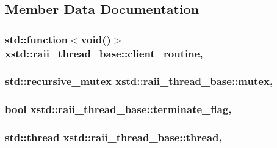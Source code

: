 \subsection{Member Data Documentation}
\hypertarget{classxstd_1_1raii__thread__base_a6b3e160c7eb131008410a16c460b03ff}{
\subsubsection[{client\-\_\-routine}]{\setlength{\rightskip}{0pt plus 5cm}std\-::function$<$void()$>$ xstd\-::raii\-\_\-thread\-\_\-base\-::client\-\_\-routine\hspace{0.3cm}{\ttfamily [protected]}, {\ttfamily [inherited]}}}\label{classxstd_1_1raii__thread__base_a6b3e160c7eb131008410a16c460b03ff}
\hypertarget{classxstd_1_1raii__thread__base_a9d9e01fced1a4f58ea5a9cc165f54fe3}{
\subsubsection[{mutex}]{\setlength{\rightskip}{0pt plus 5cm}std\-::recursive\-\_\-mutex xstd\-::raii\-\_\-thread\-\_\-base\-::mutex\hspace{0.3cm}{\ttfamily [protected]}, {\ttfamily [inherited]}}}\label{classxstd_1_1raii__thread__base_a9d9e01fced1a4f58ea5a9cc165f54fe3}
\hypertarget{classxstd_1_1raii__thread__base_aaac3bfb5572d71de17cb71d7ed0bb15c}{
\subsubsection[{terminate\-\_\-flag}]{\setlength{\rightskip}{0pt plus 5cm}bool xstd\-::raii\-\_\-thread\-\_\-base\-::terminate\-\_\-flag\hspace{0.3cm}{\ttfamily [protected]}, {\ttfamily [inherited]}}}\label{classxstd_1_1raii__thread__base_aaac3bfb5572d71de17cb71d7ed0bb15c}
\hypertarget{classxstd_1_1raii__thread__base_a664b3c47514557c3047e4ee0d7d9f25f}{
\subsubsection[{thread}]{\setlength{\rightskip}{0pt plus 5cm}std\-::thread xstd\-::raii\-\_\-thread\-\_\-base\-::thread\hspace{0.3cm}{\ttfamily [protected]}, {\ttfamily [inherited]}}}\label{classxstd_1_1raii__thread__base_a664b3c47514557c3047e4ee0d7d9f25f}


